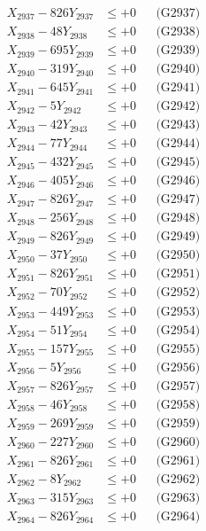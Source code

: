 \documentclass[a4paper,10pt]{article}
\begin{document}
{\begin{align}
X_{2937} - 826Y_{2937} &\leq +0 && \text{(G2937)} \\
X_{2938} - 48Y_{2938} &\leq +0 && \text{(G2938)} \\
X_{2939} - 695Y_{2939} &\leq +0 && \text{(G2939)} \\
X_{2940} - 319Y_{2940} &\leq +0 && \text{(G2940)} \\
\allowbreak
X_{2941} - 645Y_{2941} &\leq +0 && \text{(G2941)} \\
X_{2942} - 5Y_{2942} &\leq +0 && \text{(G2942)} \\
X_{2943} - 42Y_{2943} &\leq +0 && \text{(G2943)} \\
X_{2944} - 77Y_{2944} &\leq +0 && \text{(G2944)} \\
X_{2945} - 432Y_{2945} &\leq +0 && \text{(G2945)} \\
X_{2946} - 405Y_{2946} &\leq +0 && \text{(G2946)} \\
X_{2947} - 826Y_{2947} &\leq +0 && \text{(G2947)} \\
X_{2948} - 256Y_{2948} &\leq +0 && \text{(G2948)} \\
X_{2949} - 826Y_{2949} &\leq +0 && \text{(G2949)} \\
X_{2950} - 37Y_{2950} &\leq +0 && \text{(G2950)} \\
\allowbreak
X_{2951} - 826Y_{2951} &\leq +0 && \text{(G2951)} \\
X_{2952} - 70Y_{2952} &\leq +0 && \text{(G2952)} \\
X_{2953} - 449Y_{2953} &\leq +0 && \text{(G2953)} \\
X_{2954} - 51Y_{2954} &\leq +0 && \text{(G2954)} \\
X_{2955} - 157Y_{2955} &\leq +0 && \text{(G2955)} \\
X_{2956} - 5Y_{2956} &\leq +0 && \text{(G2956)} \\
X_{2957} - 826Y_{2957} &\leq +0 && \text{(G2957)} \\
X_{2958} - 46Y_{2958} &\leq +0 && \text{(G2958)} \\
X_{2959} - 269Y_{2959} &\leq +0 && \text{(G2959)} \\
X_{2960} - 227Y_{2960} &\leq +0 && \text{(G2960)} \\
\allowbreak
X_{2961} - 826Y_{2961} &\leq +0 && \text{(G2961)} \\
X_{2962} - 8Y_{2962} &\leq +0 && \text{(G2962)} \\
X_{2963} - 315Y_{2963} &\leq +0 && \text{(G2963)} \\
X_{2964} - 826Y_{2964} &\leq +0 && \text{(G2964)} \\

\end{align}}
\end{document}
